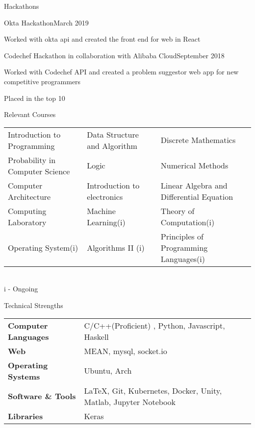 \documentclass{resume}
\newcommand{\tab}[1]{\hspace{6cm}\rlap{#1}}
\newcommand{\itab}[1]{\hspace{-0.1cm}\rlap{#1}}
\begin{document}
\begin{rSection}{Hackathons}

\begin{rSubsection}{Okta Hackathon}{March 2019}{}{}

\item Worked with okta api and created the front end for web in React

\end{rSubsection}

\begin{rSubsection}{Codechef Hackathon in collaboration with Alibaba Cloud}{September 2018}{}{}

\item Worked with Codechef API and created a problem suggestor web app for new competitive programmers
\item Placed in the top 10

\end{rSubsection}

\end{rSection}


\begin{rSection}{Relevant Courses}
\begin{tabular}{ l l l }
 Introduction to Programming & Data Structure and Algorithm & Discrete Mathematics \\ 
 Probability in Computer Science & Logic & Numerical Methods\\  
 Computer Architecture & Introduction to electronics & Linear Algebra and Differential Equation\\
 Computing Laboratory & Machine Learning(i) & Theory of Computation(i) \\
 Operating System(i) & Algorithms II (i) & Principles of Programming Languages(i)\\
\end{tabular}
\\ i  - Ongoing

\end{rSection}

\begin{rSection}{Technical Strengths}

\begin{tabular}{ @{} >{\bfseries}l @{\hspace{6ex}} l }
Computer Languages &   C/C++(Proficient) , Python, Javascript, Haskell\\
Web & MEAN, mysql, socket.io\\
Operating Systems & Ubuntu, Arch\\
Software \& Tools &  LaTeX, Git, Kubernetes, Docker, Unity, Matlab, Jupyter Notebook \\
Libraries & Keras\\
\end{tabular}

\end{rSection}
\end{document}

